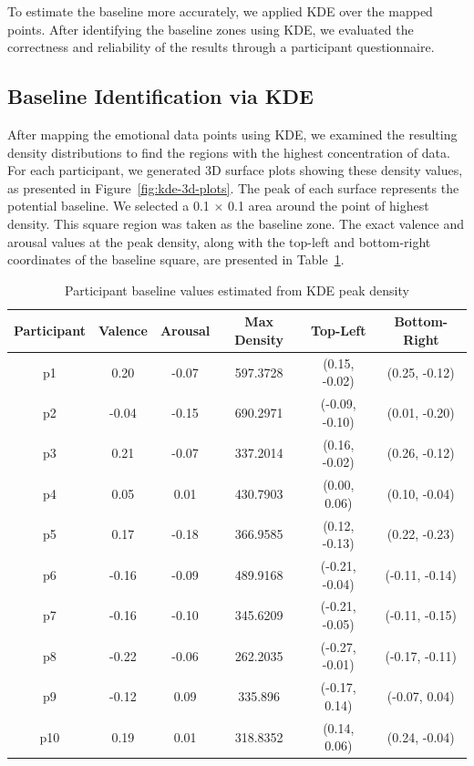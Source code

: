 To estimate the baseline more accurately, we applied KDE over the mapped points. After identifying the baseline zones using KDE, we evaluated the correctness and reliability of the results through a participant questionnaire. 


\subsection*{Baseline Identification via KDE}
After mapping the emotional data points using KDE, we examined the resulting density distributions to find the regions with the highest concentration of data. For each participant, we generated 3D surface plots showing these density values, as presented in Figure~\ref{fig:kde-3d-plots}. The peak of each surface represents the potential baseline. We selected a 0.1 $\times$ 0.1 area around the point of highest density. This square region was taken as the baseline zone. The exact valence and arousal values at the peak density, along with the top-left and bottom-right coordinates of the baseline square, are presented in Table~\ref{tab:baseline-kde-values}.


\begin{table}[H]
    \centering
    \caption{Participant baseline values estimated from KDE peak density}
    \label{tab:baseline-kde-values}
    \begin{tabular}{|c|c|c|c|c|c|}
        \hline
        \textbf{Participant} & \textbf{Valence} & \textbf{Arousal} & \textbf{Max Density} & \textbf{Top-Left } & \textbf{Bottom-Right} \\
        \hline
        p1  & 0.20  & -0.07 & 597.3728 & (0.15, -0.02) & (0.25, -0.12) \\
        p2  & -0.04 & -0.15 & 690.2971 & (-0.09, -0.10) & (0.01, -0.20) \\
        p3  & 0.21  & -0.07 & 337.2014 & (0.16, -0.02) & (0.26, -0.12) \\
        p4  & 0.05  & 0.01  & 430.7903 & (0.00, 0.06) & (0.10, -0.04) \\
        p5  & 0.17  & -0.18 & 366.9585 & (0.12, -0.13) & (0.22, -0.23) \\
        p6  & -0.16 & -0.09 & 489.9168 & (-0.21, -0.04) & (-0.11, -0.14) \\
        p7  & -0.16 & -0.10 & 345.6209 & (-0.21, -0.05) & (-0.11, -0.15) \\
        p8  & -0.22 & -0.06 & 262.2035 & (-0.27, -0.01) & (-0.17, -0.11) \\
        p9  & -0.12 & 0.09  & 335.896  & (-0.17, 0.14) & (-0.07, 0.04) \\
        p10 & 0.19  & 0.01  & 318.8352 & (0.14, 0.06) & (0.24, -0.04) \\
        \hline
    \end{tabular}
\end{table}


